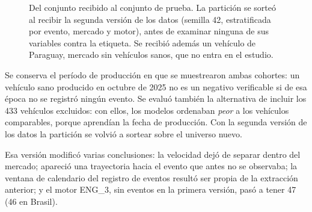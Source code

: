 \begin{figure}[!htbp]
\centering
{}
\caption{Del conjunto recibido al conjunto de prueba. La partición se sorteó al recibir la segunda versión de los datos (semilla 42,
estratificada por evento, mercado y motor), antes de examinar ninguna de sus variables contra la etiqueta. Se recibió además
un vehículo de Paraguay, mercado sin vehículos sanos, que no entra en el estudio.}
\label{fig:embudo}
\end{figure}

Se conserva el período de producción en que se muestrearon ambas cohortes: un vehículo sano producido en octubre de 2025 no
es un negativo verificable si de esa época no se registró ningún evento. Se evaluó también la alternativa de incluir los 433
vehículos excluidos: con ellos, los modelos ordenaban \emph{peor} a los vehículos comparables, porque aprendían la fecha de
producción. Con la segunda versión de los datos la partición se volvió a sortear sobre el universo nuevo.

Esa versión modificó varias conclusiones: la velocidad dejó de separar dentro del mercado; apareció una trayectoria
hacia el evento que antes no se observaba; la ventana de calendario del registro de eventos resultó ser propia de la
extracción anterior; y el motor ENG\_3, sin eventos en la primera versión, pasó a tener 47 (46 en Brasil).

